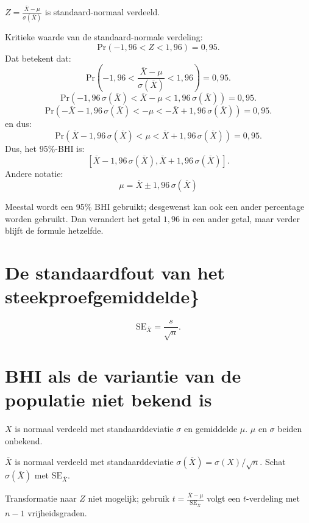 \documentclass[
  a4paper,
]{scrbook}
\theoremstyle{definition}
\theoremstyle{definition}
\theoremstyle{remark}
\begin{document}
\(Z = \frac{\overline{X} - \mu}{\sigma\left(\overline{X}\right)}\) is
standaard-normaal verdeeld.

Kritieke waarde van de standaard-normale verdeling: \[    
\textrm{Pr}\!\left(-1{,}96 < Z < 1{,}96\right) = 0{,}95.  
\] Dat betekent dat: \[    
\textrm{Pr}\!\left(-1{,}96 < \frac{\overline{X} - \mu}{\sigma\left(\overline{X}\right)} < 1{,}96\right) = 0{,}95.
\] \[    
\textrm{Pr}\!\left(-1{,}96\, \sigma\left(\overline{X}\right) < \overline{X} - \mu < 1{,}96\,\sigma\left(\overline{X}\right)\right) = 0{,}95.
\] \[
\textrm{Pr}\!\left(-\overline{X} -1{,}96\, \sigma\left(\overline{X}\right) < - \mu < - \overline{X} + 1{,}96\, \sigma\left(\overline{X}\right)\right) = 0{,}95.
\] en dus: \[
\textrm{Pr}\!\left(\overline{X} -1{,}96\, \sigma\left(\overline{X}\right) < \mu < \overline{X} + 1{,}96\, \sigma\left(\overline{X}\right)\right) = 0{,}95.
\] Dus, het 95\%-BHI is:
\[\left[\overline{X} -1{,}96\, \sigma\left(\overline{X}\right), \overline{X} + 1{,}96\, \sigma\left(\overline{X}\right) \right].\]
Andere notatie:
\[ \mu = \overline{X} \pm 1{,}96\, \sigma\left(\overline{X}\right) \]

Meestal wordt een 95\% BHI gebruikt; desgewenst kan ook een ander
percentage worden gebruikt. Dan verandert het getal \(1{,}96\) in een
ander getal, maar verder blijft de formule hetzelfde.

\section{De standaardfout van het
steekproefgemiddelde\}}\label{de-standaardfout-van-het-steekproefgemiddelde}

\[
\mathrm{SE}_{\overline{X}} = \frac{s}{\sqrt{n}}.
\]

\section{BHI als de variantie van de populatie niet bekend
is}\label{bhi-als-de-variantie-van-de-populatie-niet-bekend-is}

\(X\) is normaal verdeeld met standaarddeviatie \(\sigma\) en gemiddelde
\(\mu\). \(\mu\) en \(\sigma\) beiden onbekend.

\(\overline{X}\) is normaal verdeeld met standaarddeviatie
\(\sigma\left(\overline{X}\right) = \sigma\left(X\right)/\sqrt{n}\).
Schat \(\sigma\left(\overline{X}\right)\) met
\(\mathrm{SE}_{\overline{X}}\).

Transformatie naar \(Z\) niet mogelijk; gebruik
\(t = \frac{\overline{X} - \mu}{\mathrm{SE}_{\overline{X}}}\) volgt een
\(t\)-verdeling met \(n - 1\) vrijheidsgraden.
\end{document}
